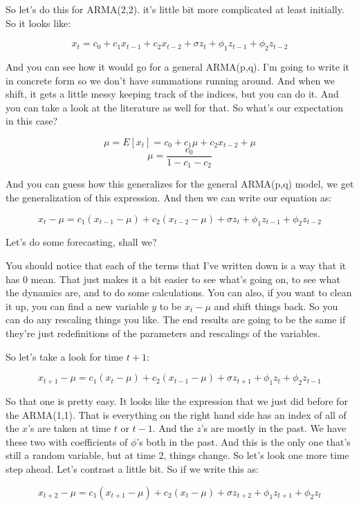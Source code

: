 \documentclass{article}
\begin{document}
So let's do this for ARMA(2,2).
it's little bit more complicated at least initially.
So it looks like:

$$x_t = c_0+c_1 x_{t-1} + c_2 x_{t-2} + \sigma z_t + \phi_1 z_{t-1} + \phi_2 z_{t-2} $$

And you can see how it would go for a general ARMA(p,q).
I'm going to write it in concrete form
so we don't have summations running around.
And when we shift, it gets a little messy
keeping track of the indices, but you can do it.
And you can take a look at the literature as well for that.
So what's our expectation in this case?

$$ \mu = E[x_t] =  c_0+c_1 \mu + c_2 x_{t-2} + \mu  $$
$$ \mu = \frac{c_0}{1-c_1 - c_2}    $$


And you can guess how this generalizes
for the general ARMA(p,q) model, we
get the generalization of this expression.
And then we can write our equation
as:

$$ x_t - \mu = c_1(x_{t-1}-\mu) + c_2(x_{t-2}-\mu) + \sigma z_t + \phi_1 z_{t-1} + \phi_2 z_{t-2} $$

Let's do some forecasting, shall we?

You should notice that each of the terms that I've
written down is a way that it has 0 mean.
That just makes it a bit easier to see what's going on,
to see what the dynamics are, and to do some calculations.
You can also, if you want to clean it up,
you can find a new variable $y$ to be $x_t - \mu$ and shift things
back.
So you can do any rescaling things you like.
The end results are going to be the same if they're just
redefinitions of the parameters and rescalings
of the variables.

So let's take a look for time $t+1$:

$$ x_{t+1} - \mu = c_1(x_{t}-\mu) + c_2(x_{t-1}-\mu) + \sigma z_{t+1} + \phi_1 z_{t} + \phi_2 z_{t-1} $$


So that one is pretty easy.
It looks like the expression that we just
did before for the ARMA(1,1).
That is everything on the right hand side has an index of 
all of the $x$'s are taken at time $t$ or $t-1$.
And the $z$'s are mostly in the past.
We have these two with coefficients
of $\phi$'s both in the past.
And this is the only one that's still a random variable,
but at time 2, things change.
So let's look one more time step ahead.
Let's contrast a little bit.
So if we write this as:

$$ x_{t+2} - \mu = c_1(x_{t+1}-\mu) + c_2(x_{t}-\mu) + \sigma z_{t+2} + \phi_1 z_{t+1} + \phi_2 z_{t} $$
\end{document}
